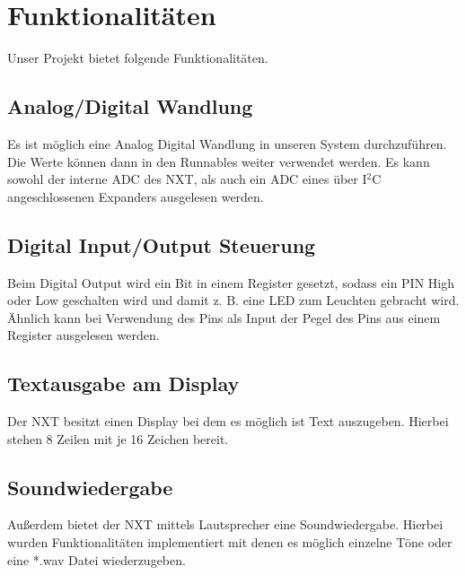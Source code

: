 \chapter{Funktionalitäten}
Unser Projekt bietet folgende Funktionalitäten.

\section{Analog/Digital Wandlung}
Es ist möglich eine Analog Digital Wandlung in unseren System durchzuführen. Die Werte können dann in den Runnables weiter verwendet werden. Es kann sowohl der interne ADC des NXT, als auch ein ADC eines über I$^2$C angeschlossenen Expanders ausgelesen werden.

\section{Digital Input/Output Steuerung}
Beim Digital Output wird ein Bit in einem Register gesetzt, sodass ein PIN High oder Low geschalten wird und damit z. B. eine LED zum Leuchten gebracht wird. Ähnlich kann bei Verwendung des Pins als Input der Pegel des Pins aus einem Register ausgelesen werden.

\section{Textausgabe am Display}
Der NXT besitzt einen Display bei dem es möglich ist Text auszugeben. Hierbei stehen 8 Zeilen mit je 16 Zeichen bereit.

\section{Soundwiedergabe}
Außerdem bietet der NXT mittels Lautsprecher eine Soundwiedergabe. Hierbei wurden Funktionalitäten implementiert mit denen es möglich einzelne Töne oder eine \dq{}*.wav\dq{} Datei wiederzugeben.


